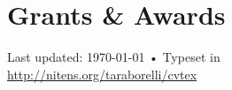 \documentclass[10pt, a4paper]{article}
\newcommand{\years}[1]{\marginnote{\scriptsize #1}}
\begin{document}


\section*{Grants \& Awards}




\vspace{1cm}
\vfill{}
\begin{center}
  {\scriptsize  Last updated: \today\- •\-
    Typeset in \href{http://nitens.org/taraborelli/cvtex}{
      \XeTeX }\\
    \href{http://nitens.org/taraborelli/cvtex}{http://nitens.org/taraborelli/cvtex}}
\end{center}
\end{document}
